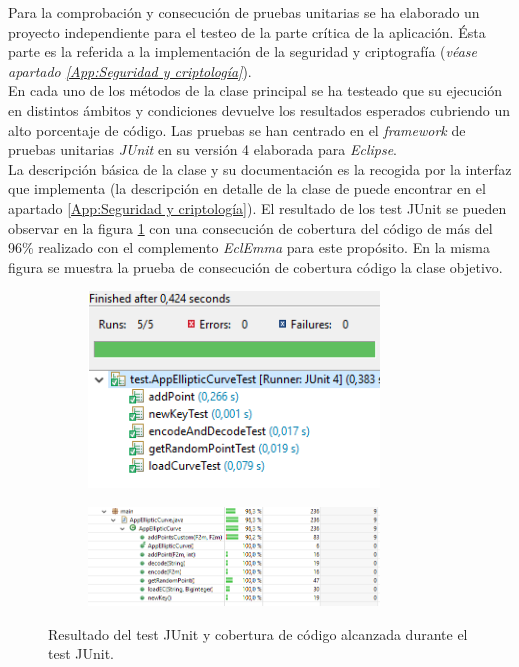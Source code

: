 \documentclass[../PFC.tex]{subfiles}
\begin{document}
Para la comprobación y consecución de pruebas unitarias se ha elaborado un proyecto independiente para el testeo de la parte crítica de la aplicación. Ésta parte es la referida a la implementación de la seguridad y criptografía (\textit{véase apartado \ref{App:Seguridad y criptología}}).
\*
\vspace{0.5515cm}
\\
En cada uno de los métodos de la clase principal se ha testeado que su ejecución en distintos ámbitos y condiciones devuelve los resultados esperados cubriendo un alto porcentaje de código. Las pruebas se han centrado en el \textit{framework} de pruebas unitarias \textit{JUnit}\cite{junit} en su versión 4 elaborada para \textit{Eclipse}\cite{eclipse}.
\*
\vspace{0.5515cm}
\\
La descripción básica de la clase y su documentación es la recogida por la interfaz que implementa (la descripción en detalle de la clase de puede encontrar en el apartado \ref{App:Seguridad y criptología}). El resultado de los test JUnit se pueden observar en la figura \ref{img:junitTest} con una consecución de cobertura del código de más del 96\% realizado con el complemento \textit{EclEmma}\cite{eclemma} para este propósito. En la misma figura se muestra la prueba de consecución de cobertura código la clase objetivo. 

\begin{figure}[H]
\centering
	\begin{subfigure}{0.4\textwidth}
		\centering
		\includegraphics[width=0.85\textwidth]{./img/junitTest}
    \end{subfigure}          
    \qquad\qquad\qquad  %
    \begin{subfigure}{0.4\textwidth}  
       \centering
       \includegraphics[width=0.85\textwidth]{./img/coveredCode}
    \end{subfigure}   
  \caption{Resultado del test JUnit y cobertura de código alcanzada durante el test JUnit.}
  \label{img:junitTest}
\end{figure}
\end{document}
